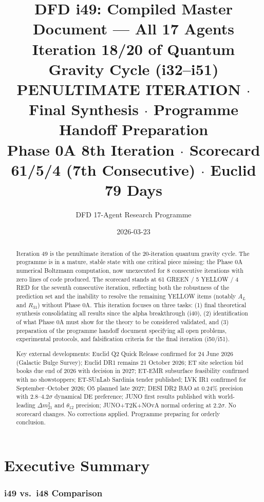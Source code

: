 \documentclass[11pt,a4paper]{article}
\title{DFD i49: Compiled Master Document --- All 17 Agents\\[6pt]
\large Iteration 18/20 of Quantum Gravity Cycle (i32--i51)\\[6pt]
\normalsize \textbf{PENULTIMATE ITERATION} $\cdot$ Final Synthesis $\cdot$ Programme Handoff Preparation\\[3pt]
\normalsize Phase 0A 8th Iteration $\cdot$ Scorecard 61/5/4 (7th Consecutive) $\cdot$ Euclid 79 Days}
\author{DFD 17-Agent Research Programme}
\date{2026-03-23}
\begin{document}
\maketitle

\begin{abstract}
Iteration 49 is the penultimate iteration of the 20-iteration quantum gravity cycle. The programme is in a mature, stable state with one critical piece missing: the Phase 0A numerical Boltzmann computation, now unexecuted for 8 consecutive iterations with zero lines of code produced. The scorecard stands at 61 GREEN / 5 YELLOW / 4 RED for the seventh consecutive iteration, reflecting both the robustness of the prediction set and the inability to resolve the remaining YELLOW items (notably $A_L$ and $R_{31}$) without Phase 0A. This iteration focuses on three tasks: (1) final theoretical synthesis consolidating all results since the alpha breakthrough (i40), (2) identification of what Phase 0A must show for the theory to be considered validated, and (3) preparation of the programme handoff document specifying all open problems, experimental protocols, and falsification criteria for the final iteration (i50/i51).

Key external developments: Euclid Q2 Quick Release confirmed for 24 June 2026 (Galactic Bulge Survey); Euclid DR1 remains 21 October 2026; ET site selection bid books due end of 2026 with decision in 2027; ET-EMR subsurface feasibility confirmed with no showstoppers; ET-SUnLab Sardinia tender published; LVK IR1 confirmed for September--October 2026; O5 planned late 2027; DESI DR2 BAO at 0.24\% precision with 2.8--4.2$\sigma$ dynamical DE preference; JUNO first results published with world-leading $\Delta m^2_{21}$ and $\theta_{12}$ precision; JUNO+T2K+NOvA normal ordering at 2.2$\sigma$. No scorecard changes. No corrections applied. Programme preparing for orderly conclusion.
\end{abstract}

\tableofcontents
\newpage

\part{Executive Summary}

\section{i49 vs.\ i48 Comparison}
\end{document}
